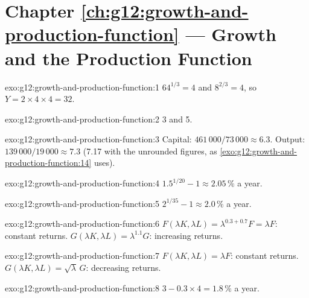 \section*{Chapter \ref{ch:g12:growth-and-production-function} --- Growth and the Production Function}

\begin{solution}{exo:g12:growth-and-production-function:1}
$64^{1/3} = 4$ and $8^{2/3} = 4$, so $Y = 2 \times 4 \times 4 = 32$.
\end{solution}

\begin{solution}{exo:g12:growth-and-production-function:2}
3 and 5.
\end{solution}

\begin{solution}{exo:g12:growth-and-production-function:3}
Capital: $461\,000/73\,000 \approx 6.3$. Output: $139\,000/19\,000 \approx 7.3$ (7.17 with the unrounded figures, as \cref{exo:g12:growth-and-production-function:14} uses).
\end{solution}

\begin{solution}{exo:g12:growth-and-production-function:4}
$1.5^{1/20} - 1 \approx 2.05\,\%$ a year.
\end{solution}

\begin{solution}{exo:g12:growth-and-production-function:5}
$2^{1/35} - 1 \approx 2.0\,\%$ a year.
\end{solution}

\begin{solution}{exo:g12:growth-and-production-function:6}
$F(\lambda K, \lambda L) = \lambda^{0.3 + 0.7}F = \lambda F$: constant returns. $G(\lambda K, \lambda L) = \lambda^{1.1}G$: increasing returns.
\end{solution}

\begin{solution}{exo:g12:growth-and-production-function:7}
$F(\lambda K, \lambda L) = \lambda F$: constant returns. $G(\lambda K, \lambda L) = \sqrt{\lambda}\,G$: decreasing returns.
\end{solution}

\begin{solution}{exo:g12:growth-and-production-function:8}
$3 - 0.3 \times 4 = 1.8\,\%$ a year.
\end{solution}

